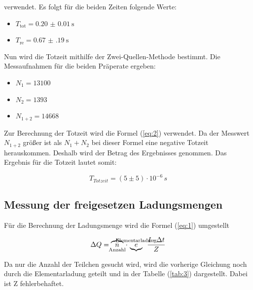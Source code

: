 verwendet. Es folgt für die beiden Zeiten folgende Werte:

\begin{itemize}
  \item $T_\text{tot} = \SI{0.20(1)}{\second}$
  \item $T_\text{re} = \SI{0.67(19)}{\second}$
\end{itemize}

Nun wird die Totzeit mithilfe der Zwei-Quellen-Methode bestimmt.
Die Messaufnahmen für die beiden Präperate ergeben:

\begin{itemize}
  \item $N_1 = 13100$
  \item $N_2 = 1393$
  \item $N_{1+2} = 14668$
\end{itemize}

Zur Berechnung der Totzeit wird die Formel (\ref{eq:2}) verwendet.
Da der Messwert $N_{1+2}$ größer ist als $N_1 + N_2$ bei dieser Formel eine
negative Totzeit herauskommen. Deshalb wird der Betrag des Ergebnisses genommen.
Das Ergebnis  für die Totzeit lautet somit:

\begin{equation*}
  T_{Totzeit} = (5 \pm 5) \cdot 10^{-6} \, s
\end{equation*}


\subsection{Messung der freigesetzen Ladungsmengen}

Für die Berechnung der Ladungsmenge wird die Formel (\ref{eq:1}) umgestellt

\begin{equation*}
  \Delta Q =\overbrace{n}_{\mathclap{\text{Anzahl}}}\, \cdot \, \underbrace{e}^{\mathclap{\text{Elementarladung}}}  \,\,\, \frac{I \cdot \Delta t}{Z}
\end{equation*}

Da nur die Anzahl der Teilchen gesucht wird, wird die vorherige Gleichung noch durch die Elementarladung geteilt und in der Tabelle (\ref{tab:3})
dargestellt. Dabei ist Z fehlerbehaftet.

